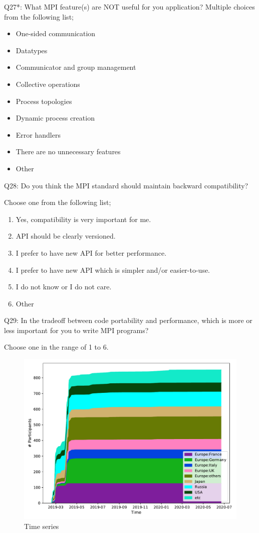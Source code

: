 \begin{description}
\item{Q27*:} What MPI feature(s) are NOT useful for you application?
Multiple choices from the following list;
\begin{itemize}
\item One-sided communication
\item Datatypes
\item Communicator and group management
\item Collective operations
\item Process topologies
\item Dynamic process creation
\item Error handlers
\item There are no unnecessary features
\item Other
\end{itemize}

\item{Q28:} Do you think the MPI standard should maintain backward
compatibility? 

Choose one from the following list;
\begin{enumerate}
\item Yes, compatibility is very important for me.
\item API should be clearly versioned.
\item I prefer to have new API for better performance.
\item I prefer to have new API which is simpler and/or easier-to-use.
\item I do not know or I do not care.
\item Other
\end{enumerate}

\item{Q29:} In the tradeoff between code portability and performance,
which is more or less important for you to write MPI programs? 

Choose one in the range of 1 to 6.

\end{description}





\begin{figure}[htb]
\begin{center}
\includegraphics[width=12cm]{../pdfs/TimeSeries.pdf}
\caption{Time series}
\label{fig:timeseries}
\end{center}
\end{figure}
